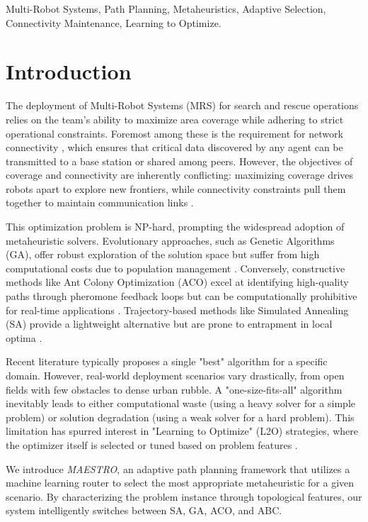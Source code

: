 \documentclass[conference]{IEEEtran}
\newcommand{\systemname}{MAESTRO}
\begin{document}
\begin{IEEEkeywords}
Multi-Robot Systems, Path Planning, Metaheuristics, Adaptive Selection, Connectivity Maintenance, Learning to Optimize.
\end{IEEEkeywords}

\section{Introduction}
\label{sec:introduction}

The deployment of Multi-Robot Systems (MRS) for search and rescue operations relies on the team's ability to maximize area coverage while adhering to strict operational constraints. Foremost among these is the requirement for network connectivity \cite{li2008swarm}, which ensures that critical data discovered by any agent can be transmitted to a base station or shared among peers. However, the objectives of coverage and connectivity are inherently conflicting: maximizing coverage drives robots apart to explore new frontiers, while connectivity constraints pull them together to maintain communication links \cite{yamauchi1997frontier}.

This optimization problem is NP-hard, prompting the widespread adoption of metaheuristic solvers. Evolutionary approaches, such as Genetic Algorithms (GA), offer robust exploration of the solution space but suffer from high computational costs due to population management \cite{deb2023multi}. Conversely, constructive methods like Ant Colony Optimization (ACO) excel at identifying high-quality paths through pheromone feedback loops but can be computationally prohibitive for real-time applications \cite{dorigo2024aco}. Trajectory-based methods like Simulated Annealing (SA) provide a lightweight alternative but are prone to entrapment in local optima \cite{kirkpatrick2021sa}.

Recent literature typically proposes a single "best" algorithm for a specific domain. However, real-world deployment scenarios vary drastically, from open fields with few obstacles to dense urban rubble. A "one-size-fits-all" algorithm inevitably leads to either computational waste (using a heavy solver for a simple problem) or solution degradation (using a weak solver for a hard problem). This limitation has spurred interest in "Learning to Optimize" (L2O) strategies, where the optimizer itself is selected or tuned based on problem features \cite{chen2022learning}.

We introduce \textit{\systemname{}}, an adaptive path planning framework that utilizes a machine learning router to select the most appropriate metaheuristic for a given scenario. By characterizing the problem instance through topological features, our system intelligently switches between SA, GA, ACO, and ABC.
\end{document}
